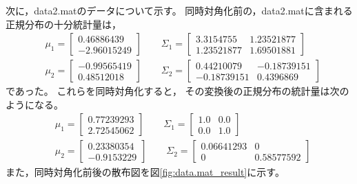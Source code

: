\documentclass[dvipdfmx, fleqn]{jsarticle}
\begin{document}
次に，data2.matのデータについて示す。
同時対角化前の，data2.matに含まれる正規分布の十分統計量は，
\begin{align}
	& \mu_1 =
		\begin{bmatrix}
			0.46886439 \\ -2.96015249
		\end{bmatrix}
	\qquad \Sigma_1 =
		\begin{bmatrix}
			3.3154755 & 1.23521877 \\
			1.23521877 & 1.69501881
		\end{bmatrix} \\
	& \mu_2 =
		\begin{bmatrix}
			-0.99565419 \\ 0.48512018
		\end{bmatrix}
	\qquad \Sigma_2 =
		\begin{bmatrix}
			0.44210079 & -0.18739151 \\
			-0.18739151 & 0.4396869
		\end{bmatrix}
\end{align}
であった。
これらを同時対角化すると，
その変換後の正規分布の統計量は次のようになる。
\begin{align}
	& \mu_1 =
		\begin{bmatrix}
			0.77239293 \\ 2.72545062
		\end{bmatrix}
	\qquad \Sigma_1 =
		\begin{bmatrix}
			1.0 & 0.0 \\
			0.0 & 1.0
		\end{bmatrix} \\
	& \mu_2 =
		\begin{bmatrix}
			0.23380354 \\ -0.9153229
		\end{bmatrix}
	\qquad \Sigma_2 =
		\begin{bmatrix}
			0.06641293 & 0 \\
			0 & 0.58577592
		\end{bmatrix}
\end{align}
また，同時対角化前後の散布図を図\ref{fig:data.mat_result}に示す。
\end{document}
